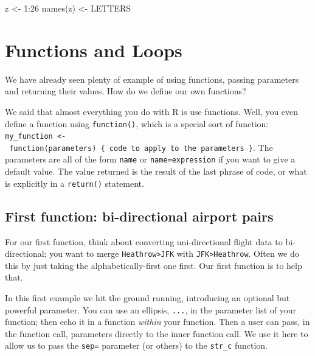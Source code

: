 \documentclass[
]{book}
\newenvironment{Shaded}{\begin{snugshade}}{\end{snugshade}}
\newcommand{\DecValTok}[1]{\textcolor[rgb]{0.00,0.00,0.81}{#1}}
\newcommand{\FunctionTok}[1]{\textcolor[rgb]{0.00,0.00,0.00}{#1}}
\newcommand{\NormalTok}[1]{#1}
\newcommand{\OtherTok}[1]{\textcolor[rgb]{0.56,0.35,0.01}{#1}}
\newcommand{\SpecialCharTok}[1]{\textcolor[rgb]{0.00,0.00,0.00}{#1}}
\begin{document}
\begin{Shaded}
\begin{Highlighting}[]
\NormalTok{z }\OtherTok{\textless{}{-}} \DecValTok{1}\SpecialCharTok{:}\DecValTok{26}
\FunctionTok{names}\NormalTok{(z) }\OtherTok{\textless{}{-}}\NormalTok{ LETTERS }
\end{Highlighting}
\end{Shaded}

\hypertarget{functions-and-loops}{%
\section{Functions and Loops}\label{functions-and-loops}}

We have already seen plenty of example of using functions, passing parameters and returning their values. How do we define our own functions?

We said that almost everything you do with R is use functions. Well, you even define a function using \texttt{function()}, which is a special sort of function: \texttt{my\_function\ \textless{}-\ function(parameters)\ \{\ code\ to\ apply\ to\ the\ parameters\ \}}. The parameters are all of the form \texttt{name} or \texttt{name=expression} if you want to give a default value. The value returned is the result of the last phrase of code, or what is explicitly in a \texttt{return()} statement.

\hypertarget{first-function-bi-directional-airport-pairs}{%
\subsection{First function: bi-directional airport pairs}\label{first-function-bi-directional-airport-pairs}}

For our first function, think about converting uni-directional flight data to bi-directional: you want to merge \texttt{Heathrow\textgreater{}JFK} with \texttt{JFK\textgreater{}Heathrow}. Often we do this by just taking the alphabetically-first one first. Our first function is to help that.

In this first example we hit the ground running, introducing an optional but powerful parameter. You can use an ellipsis, \texttt{...}, in the parameter list of your function; then echo it in a function \emph{within} your function. Then a user can pass, in the function call, parameters directly to the inner function call. We use it here to allow us to pass the \texttt{sep=} parameter (or others) to the \texttt{str\_c} function.
\end{document}
